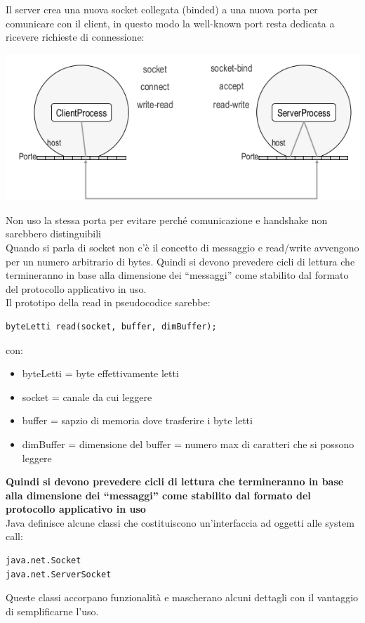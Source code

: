 \documentclass[a4paper,12pt, oneside]{book}
\begin{document}
Il server crea una nuova socket collegata (binded) a una
nuova porta per comunicare con il client, in questo modo la well-known port resta dedicata a ricevere richieste di connessione:
\begin{center}
	\includegraphics[scale=3]{img/sc4.png}
\end{center}
Non uso la stessa porta per evitare perché comunicazione e handshake non sarebbero distinguibili\\
Quando si parla di socket non c'è il concetto di messaggio e read/write avvengono per un numero arbitrario di bytes. Quindi si devono prevedere cicli di lettura che
termineranno in base alla dimensione dei “messaggi” come
stabilito dal formato del protocollo applicativo in uso. \\
Il prototipo della read in pseudocodice sarebbe:
\begin{verbatim}
byteLetti read(socket, buffer, dimBuffer);
\end{verbatim}
con:
\begin{itemize}
	\item byteLetti = byte effettivamente letti
	\item socket = canale da cui leggere
	\item buffer = sapzio di memoria dove trasferire i byte letti
	\item dimBuffer = dimensione del buffer = numero max di caratteri che si possono leggere
\end{itemize}
\textbf{Quindi si devono prevedere cicli di lettura che
	termineranno in base alla dimensione dei “messaggi” come
	stabilito dal formato del protocollo applicativo in uso}\\
Java definisce alcune classi che costituiscono un'interfaccia ad oggetti alle system call:
\begin{verbatim}
java.net.Socket
java.net.ServerSocket
\end{verbatim}
Queste classi accorpano funzionalità e mascherano alcuni
dettagli con il vantaggio di semplificarne l'uso.
\end{document}
